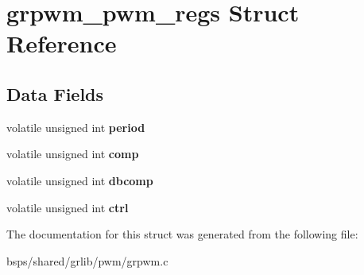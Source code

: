 \hypertarget{structgrpwm__pwm__regs}{}\section{grpwm\+\_\+pwm\+\_\+regs Struct Reference}
\label{structgrpwm__pwm__regs}
\subsection*{Data Fields}
\begin{DoxyCompactItemize}
\item 
\mbox{\label{structgrpwm__pwm__regs_aba4a5261bc0d823a9e36c4342d6f2429}} 
volatile unsigned int {\bfseries period}
\item 
\mbox{\label{structgrpwm__pwm__regs_a9c7cbec822b95b138e6741db2c93a3b6}} 
volatile unsigned int {\bfseries comp}
\item 
\mbox{\label{structgrpwm__pwm__regs_a358e08dce97014b28fa030cfc6f4a042}} 
volatile unsigned int {\bfseries dbcomp}
\item 
\mbox{\label{structgrpwm__pwm__regs_a6454e589db1644d5a3ab19d3a95dd34c}} 
volatile unsigned int {\bfseries ctrl}
\end{DoxyCompactItemize}


The documentation for this struct was generated from the following file\+:\begin{DoxyCompactItemize}
\item 
bsps/shared/grlib/pwm/grpwm.\+c\end{DoxyCompactItemize}
